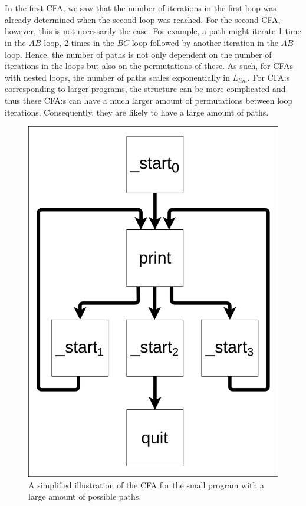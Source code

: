 \documentclass{kththesis}
\begin{document}
\\ \\
In the first CFA, we saw that the number of iterations in the first loop was already determined when the second loop was reached. For the second CFA, however, this is not necessarily the case. For example, a path might iterate 1 time in the $AB$ loop, 2 times in the $BC$ loop followed by another iteration in the $AB$ loop. Hence, the number of paths is not only dependent on the number of iterations in the loops but also on the permutations of these. As such, for CFAs with nested loops, the number of paths scales exponentially in $L_{lim}$. For CFA:s corresponding to larger programs, the structure can be more complicated and thus these CFA:s can have a much larger amount of permutations between loop iterations. Consequently, they are likely to have a large amount of paths.
\begin{figure}[!t]
    \centering
\includegraphics[scale=0.3]{Images/pathExpCFA.png}
    \caption{A simplified illustration of the CFA for the small program with a large amount of possible paths.}
    \label{fig:pathExpCFA}
\end{figure}
\end{document}
